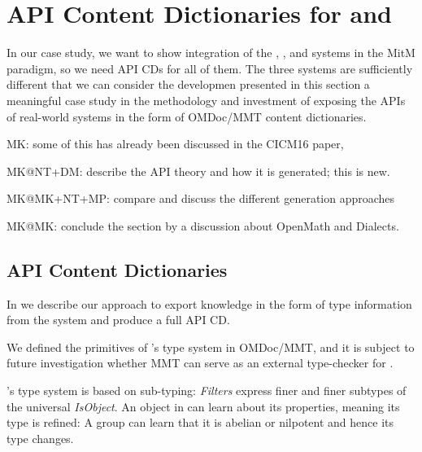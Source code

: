 \section{API Content Dictionaries for \GAP and \Sage}\label{sec:apit}
In our case study, we want to show integration of the \GAP, \Singular, and \Sage systems
in the MitM paradigm, so we need API CDs for all of them. The three systems are
sufficiently different that we can consider the developmen presented in this section a
meaningful case study in the methodology and investment of exposing the APIs of real-world
systems in the form of OMDoc/MMT content dictionaries.

\begin{todolist}{MK: some of this has already been discussed in the CICM16 paper, }
\item MK@NT+DM: describe the \Sage API theory and how it is generated; this is
  new. 
\item MK@MK+NT+MP: compare and discuss the different generation approaches
\item MK@MK: conclude the section by a discussion about OpenMath and Dialects.
\end{todolist}


\subsection{\GAP API Content Dictionaries}

In \cite{DehKohKon:iop16} we describe our approach to export knowledge in the
form of type information from the \GAP system and produce a full \GAP API CD.

We defined the primitives of \GAP's type system in OMDoc/MMT, and it is
subject to future investigation whether MMT can serve as an external type-checker
for \GAP.

\GAP's type system is based on sub-typing: \emph{Filters} express finer and finer
subtypes of the universal \emph{IsObject}. An object in \GAP can learn about its
properties, meaning its type is refined: A group can learn that it is abelian or
nilpotent and hence its type changes.

